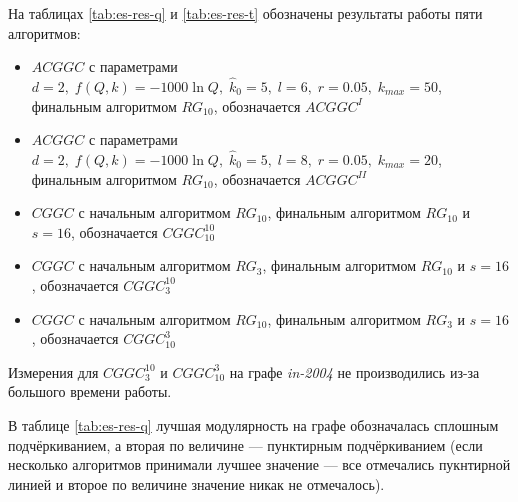 На таблицах \ref{tab:es-res-q} и \ref{tab:es-res-t} обозначены результаты работы пяти алгоритмов:
\begin{itemize}
	\item $ACGGC$ с параметрами $d = 2,\;f(Q, k) = -1000 \ln Q,\;\hat{k}_0 = 5,\;l = 6,\;r = 0.05,\;k_{max} = 50$, финальным алгоритмом $RG_{10}$, обозначается $ACGGC^I$
	\item $ACGGC$ с параметрами $d = 2,\;f(Q, k) = -1000 \ln Q,\;\hat{k}_0 = 5,\;l = 8,\;r = 0.05,\;k_{max} = 20$, финальным алгоритмом $RG_{10}$, обозначается $ACGGC^{II}$
	\item $CGGC$ с начальным алгоритмом $RG_{10}$, финальным алгоритмом $RG_{10}$ и $s = 16$, обозначается $CGGC_{10}^{10}$
	\item $CGGC$ с начальным алгоритмом $RG_{3}$, финальным алгоритмом $RG_{10}$ и $s = 16$, обозначается $CGGC_{3}^{10}$
	\item $CGGC$ с начальным алгоритмом $RG_{10}$, финальным алгоритмом $RG_{3}$ и $s = 16$, обозначается $CGGC_{10}^{3}$
\end{itemize}

Измерения для $CGGC_3^{10}$ и $CGGC_{10}^3$ на графе \emph{in-2004} не производились из-за большого времени работы.

В таблице \ref{tab:es-res-q} лучшая модулярность на графе обозначалась сплошным подчёркиванием, а вторая по величине --- пунктирным подчёркиванием (если несколько алгоритмов принимали лучшее значение --- все отмечались пукнтирной линией и второе по величине значение никак не отмечалось).

